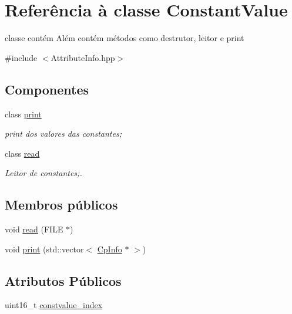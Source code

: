 \hypertarget{class_constant_value}{}\section{Referência à classe Constant\+Value}
\label{class_constant_value}


classe contém Além contém métodos como destrutor, leitor e print  




{\ttfamily \#include $<$Attribute\+Info.\+hpp$>$}

\subsection*{Componentes}
\begin{DoxyCompactItemize}
\item 
class \hyperlink{class_constant_value_1_1print}{print}
\begin{DoxyCompactList}\small\item\em print dos valores das constantes; \end{DoxyCompactList}\item 
class \hyperlink{class_constant_value_1_1read}{read}
\begin{DoxyCompactList}\small\item\em Leitor de constantes;. \end{DoxyCompactList}\end{DoxyCompactItemize}
\subsection*{Membros públicos}
\begin{DoxyCompactItemize}
\item 
void \hyperlink{class_constant_value_aee71ff590a730276c8da00dbdee74ecf}{read} (F\+I\+LE $\ast$)
\item 
void \hyperlink{class_constant_value_a99dd9b4165766a0347e126c580fa93d0}{print} (std\+::vector$<$ \hyperlink{class_cp_info}{Cp\+Info} $\ast$ $>$)
\end{DoxyCompactItemize}
\subsection*{Atributos Públicos}
\begin{DoxyCompactItemize}
\item 
uint16\+\_\+t \hyperlink{class_constant_value_aaa51c41fc17e11c759e2d0dccbf178e8}{constvalue\+\_\+index}
\end{DoxyCompactItemize}


